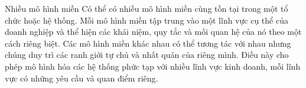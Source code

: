 Nhiều mô hình miền
Có thể có nhiều mô hình miền cùng tồn tại trong một tổ chức hoặc hệ thống. Mỗi mô hình miền tập trung vào một lĩnh vực cụ thể của doanh nghiệp và thể hiện các khái niệm, quy tắc và mối quan hệ của nó theo một cách riêng biệt. Các mô hình miền khác nhau có thể tương tác với nhau nhưng chúng duy trì các ranh giới tự chủ và nhất quán của riêng mình. Điều này cho phép mô hình hóa các hệ thống phức tạp với nhiều lĩnh vực kinh doanh, mỗi lĩnh vực có những yêu cầu và quan điểm riêng.

